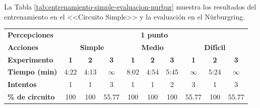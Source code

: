 La Tabla \ref{tab:entrenamiento-simple-evaluacion-nurbur} muestra los resultados del entrenamiento en el <<Circuito Simple>> y la evaluación en el Nürburgring.


\begin{table}[ht!]
\centering
\begin{tabular}{|l|c|c|c|c|c|c|c|c|c|}
\hline
\rowcolor[HTML]{EFEFEF} 
\multicolumn{10}{|c|}{\cellcolor[HTML]{EFEFEF}\textbf{Entrenamiento en Circuito Simple y ejecución en Nürburgring}}                                                                                                                                                               \\ \hline
\rowcolor[HTML]{EFEFEF} 
\textbf{Percepciones}                           & \multicolumn{9}{c|}{\cellcolor[HTML]{EFEFEF}\textbf{1 punto}}                                                                                                                                                            \\ \hline
\rowcolor[HTML]{EFEFEF} 
\textbf{Acciones}                               & \multicolumn{3}{c|}{\cellcolor[HTML]{EFEFEF}\textbf{Simple}} & \multicolumn{3}{c|}{\cellcolor[HTML]{EFEFEF}\textbf{Medio}} & \multicolumn{3}{c|}{\cellcolor[HTML]{EFEFEF}\textbf{Difícil}}                               \\ \hline
\rowcolor[HTML]{EFEFEF} 
\textbf{Experimento}                            & \textbf{1}   & \textbf{2}   & \textbf{3}                     & \textbf{1}   & \textbf{2}   & \textbf{3}                    & \textbf{1}                    & \textbf{2}                  & \textbf{3}                    \\ \hline
\rowcolor[HTML]{FFFFFF} 
\cellcolor[HTML]{EFEFEF}\textbf{Tiempo (min)}   & 4:22         & \cellcolor[HTML]{32CB00}4:13         & $\infty$                       & 8:02         & 4:54         & 5:45                          & $\infty$                      & 5:24                        & $\infty$                      \\ \hline
\rowcolor[HTML]{FFFFFF} 
\cellcolor[HTML]{EFEFEF}\textbf{Intentos}       & 1            & 1            & 3                              & 1            & 1            & 2                             & 3                             & 1                           & 3                             \\ \hline
\rowcolor[HTML]{32CB00} 
\cellcolor[HTML]{EFEFEF}\textbf{\% de circuito} & 100          & 100          & \cellcolor[HTML]{FFC702}55.77  & 100          & 100          & 100                           & \cellcolor[HTML]{FFC702}55.77 & 100                         & \cellcolor[HTML]{FFC702}55.77 \\ \hline

\end{tabular}
\end{table}
